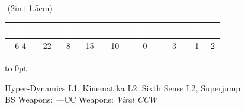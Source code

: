 \begin{stdminipage}{\linewidth-(2in+1.5em)}
\begin{minipage}{\linewidth}
{\begin{minipage}{5in}
\colorbox{Gray!24}{\begin{minipage}{\linewidth-2\fboxsep}

    \medskip    
\noindent\hfill\begin{tabular}[t]{ccccccccc}
\rowcolor{Black}  \textbf{\textcolor{White}{MOV}} & \textbf{\textcolor{White}{CC}} & \textbf{\textcolor{White}{BS}} & \textbf{\textcolor{White}{PH}} & \textbf{\textcolor{White}{WIP}} & \textbf{\textcolor{White}{ARM}} & \textbf{\textcolor{White}{BTS}} & \textbf{\textcolor{White}{W}} & \textbf{\textcolor{White}{S}}\\
  \hline
  6-4 & 22 & 8 & 15 & 10 & 0 & 3 & 1 & 2\\
\end{tabular}
\hfill\hbox to 0pt{}

\medskip
Hyper-Dynamics L1, Kinematika L2, Sixth Sense L2, Superjump\\
BS Weapons: \emph{---}\hfill CC Weapons: \emph{Viral CCW}
    \end{minipage}}
\end{minipage}}
\end{minipage}

\end{stdminipage}
\hfill
